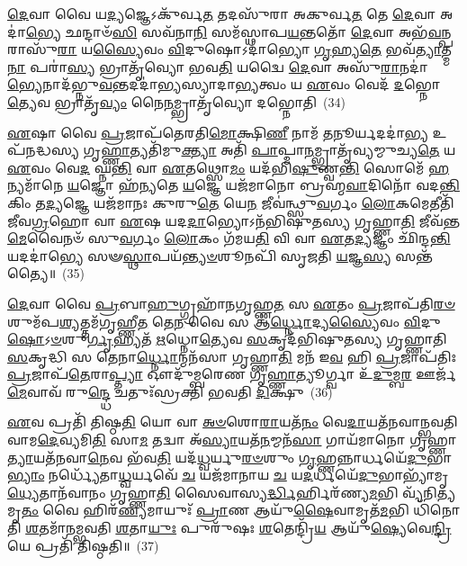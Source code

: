 {\anuvakamend[{\-\ul{𑌉}\-𑌕𑍍𑌥𑍍𑌯𑍇᳴ \ul{𑌦𑍇}\-𑌵𑌾 \ul{𑌅}\-𑌮𑍁𑌷𑍍𑌮𑌿᳴\-\ul{𑌲𑍍𑌲𑍋𑌁}\-𑌕 𑌏\-\ul{𑌕𑌾}\-𑌨𑍍𑌨𑌚᳴𑌤𑍍𑌵𑌾\-\ul{𑌰𑌿}\-\-\ul{𑍞}\-𑌶𑌚𑍍𑌚᳴}]}%

\-\ul{𑌦𑍇}\-𑌵𑌾 𑌵𑍈 𑌯\-\ul{𑌦𑍍𑌯}\-𑌜𑍍𑌞𑍇\-𑌽𑌕𑍁᳴𑌰𑍍𑌵\-\ul{𑌤} 𑌤𑌦𑌸𑍁᳴𑌰𑌾 𑌅𑌕𑍁𑌰𑍍𑌵\-\ul{𑌤} 𑌤𑍇 \ul{𑌦𑍇}\-𑌵𑌾 𑌅𑌦𑌾॑\-\ul{𑌭𑍍𑌯𑍇} 𑌛𑌨𑍍𑌦𑌾𑍞᳴\-\ul{𑌸𑌿} 𑌸𑌵᳴𑌨𑌾\-\ul{𑌨𑌿} 𑌸𑌮᳴𑌸𑍍𑌥𑌾𑌪\-\ul{𑌯}\-𑌨𑍍𑌤𑌤𑍋᳴ \ul{𑌦𑍇}\-𑌵𑌾 𑌅𑌭᳴\-\ul{𑌵}\-𑌨𑍍𑌪𑌰𑌾𑌸𑍁᳴\-\ul{𑌰𑌾} 𑌯\-\ul{𑌸𑍍𑌯𑍈}\-𑌵𑌂 \ul{𑌵𑌿}\-𑌦𑍁𑌷𑍋\-𑌽𑌦𑌾॑𑌭𑍍𑌯𑍋 \ul{𑌗𑍃}\-𑌹𑍍𑌯\-\ul{𑌤𑍇} 𑌭𑌵᳴\-\ul{𑌤𑍍𑌯𑌾}\-𑌤𑍍𑌮\-\ul{𑌨𑌾} 𑌪𑌰𑌾॑\-\ul{𑌸𑍍𑌯} 𑌭𑍍𑌰𑌾𑌤𑍃᳴𑌵𑍍𑌯𑍋 𑌭𑌵\-\ul{𑌤𑌿} 𑌯𑌦𑍍𑌵𑍈 \ul{𑌦𑍇}\-𑌵𑌾 𑌅𑌸𑍁᳴\-\ul{𑌰𑌾}\-𑌨𑌦𑌾॑\-\ul{𑌭𑍍𑌯𑍇}\-𑌨𑌾\-𑌦᳴𑌭𑍍𑌨𑍁\-\ul{𑌵}\-𑌨𑍍𑌤𑌦𑌦𑌾॑𑌭𑍍𑌯𑌸𑍍𑌯𑌾𑌦𑌾\-\ul{𑌭𑍍𑌯}\-𑌤𑍍𑌵𑌂 𑌯 \ul{𑌏}\-𑌵𑌂 𑌵𑍇𑌦᳴ \ul{𑌦}\-𑌭𑍍𑌨𑍋\-\ul{𑌤𑍍𑌯𑍇}\-𑌵 𑌭𑍍𑌰𑌾𑌤𑍃᳴\-\ul{𑌵𑍍𑌯𑌂} 𑌨𑍈\-\ul{𑌨}\-𑌮𑍍𑌭𑍍𑌰𑌾𑌤𑍃᳴𑌵𑍍𑌯𑍋 𑌦𑌭𑍍𑌨𑍋𑌤𑌿~(34)

\-\ul{𑌏}\-𑌷𑌾 𑌵𑍈 \ul{𑌪𑍍𑌰}\-𑌜𑌾𑌪᳴𑌤𑍇𑌰𑌤𑌿\-\ul{𑌮𑍋}\-𑌕𑍍𑌷𑌿\-\ul{𑌣𑍀} 𑌨𑌾𑌮᳴ \ul{𑌤}\-𑌨𑍂𑌰𑍍𑌯𑌦𑌦𑌾॑\-\ul{𑌭𑍍𑌯} 𑌉𑌪᳴𑌨𑌦𑍍𑌧𑌸𑍍𑌯 𑌗𑍃\-\ul{𑌹𑍍𑌣𑌾}\-𑌤𑍍𑌯𑌤𑌿᳴𑌮𑍁\-\ul{𑌕𑍍𑌤𑍍𑌯𑌾} 𑌅𑌤𑌿᳴ \ul{𑌪𑌾}\-𑌪𑍍𑌮𑌾\-\ul{𑌨}\-𑌮𑍍𑌭𑍍𑌰𑌾𑌤𑍃᳴𑌵𑍍𑌯𑌮𑍍𑌮𑍁𑌚𑍍𑌯\-\ul{𑌤𑍇} 𑌯 \ul{𑌏}\-𑌵𑌂 𑌵𑍇\-\ul{𑌦} 𑌘𑍍𑌨\-\ul{𑌨𑍍𑌤𑌿} 𑌵𑌾 \ul{𑌏}\-𑌤𑌥𑍍𑌸𑍋\-\ul{𑌮𑌂} 𑌯𑌦᳴𑌭𑌿\-\ul{𑌷𑍁}\-𑌣𑍍𑌵\-\ul{𑌨𑍍𑌤𑌿} 𑌸𑍋𑌮𑍇᳴ \ul{𑌹}\-𑌨𑍍𑌯𑌮𑌾᳴𑌨𑍇 \ul{𑌯}\-𑌜𑍍𑌞𑍋 𑌹᳴𑌨𑍍𑌯𑌤𑍇 \ul{𑌯}\-𑌜𑍍𑌞𑍇 𑌯𑌜᳴𑌮𑌾𑌨𑍋 𑌬𑍍𑌰𑌹𑍍𑌮\-\ul{𑌵𑌾}\-𑌦𑌿𑌨𑍋᳴ 𑌵𑌦\-\ul{𑌨𑍍𑌤𑌿} 𑌕𑌿𑌂 𑌤\-\ul{𑌦𑍍𑌯}\-𑌜𑍍𑌞𑍇 𑌯𑌜᳴𑌮𑌾𑌨𑌃 𑌕𑍁𑌰𑍁\-\ul{𑌤𑍇} 𑌯𑍇\-\ul{𑌨} 𑌜𑍀𑌵॑𑌨𑍍𑌥𑍍𑌸𑍁\-\ul{𑌵}\-𑌰𑍍𑌗𑌂 \ul{𑌲𑍋}\-𑌕𑌮𑍇𑌤𑍀𑌤𑌿᳴ 𑌜𑍀𑌵\-\ul{𑌗𑍍𑌰}\-𑌹𑍋 𑌵𑌾 \ul{𑌏}\-𑌷 𑌯𑌦\-\ul{𑌦𑌾}\-𑌭𑍍𑌯𑍋\-𑌽𑌨᳴𑌭𑌿𑌷𑍁𑌤𑌸𑍍𑌯 𑌗𑍃𑌹𑍍𑌣𑌾\-\ul{𑌤𑌿} 𑌜𑍀𑌵᳴𑌨𑍍𑌤\-\ul{𑌮𑍇}\-𑌵𑍈𑌨𑍞᳴ 𑌸𑍁\-\ul{𑌵}\-𑌰𑍍𑌗𑌂 \ul{𑌲𑍋}\-𑌕𑌂 𑌗᳴𑌮𑌯\-\ul{𑌤𑌿} 𑌵𑌿 𑌵𑌾 \ul{𑌏}\-𑌤\-\ul{𑌦𑍍𑌯}\-𑌜𑍍𑌞𑌂 𑌛𑌿᳴𑌨𑍍𑌦\-\ul{𑌨𑍍𑌤𑌿} 𑌯𑌦𑌦𑌾॑𑌭𑍍𑌯𑍇 𑌸𑍟\-\ul{𑌸𑍍𑌥𑌾}\-𑌪𑌯᳴\-\ul{𑌨𑍍𑌤𑍍𑌯}\-\-\ul{𑍞}\-𑌶𑍂𑌨𑌪𑌿᳴ 𑌸𑍃𑌜𑌤𑌿 \ul{𑌯}\-𑌜𑍍𑌞\-\ul{𑌸𑍍𑌯} 𑌸𑌨𑍍𑌤᳴𑌤𑍍𑌯𑍈॥~(35)

{\anuvakamend[{\-\ul{𑌦}\-\-\ul{𑌭𑍍𑌨𑍋}\-𑌤𑍍𑌯𑌨᳴𑌭𑌿𑌷𑍁𑌤𑌸𑍍𑌯 𑌗𑍃\-\ul{𑌹𑍍𑌣𑌾}\-𑌤𑍍𑌯𑍇\-\ul{𑌕𑌾}\-𑌨𑍍𑌨𑌵𑌿𑍞᳴\-\ul{𑌶}\-𑌤𑌿𑌶𑍍𑌚᳴}]}%

\-\ul{𑌦𑍇}\-𑌵𑌾 𑌵𑍈 \ul{𑌪𑍍𑌰}\-𑌬𑌾\-\ul{𑌹𑍁}\-𑌗𑍍𑌗𑍍𑌰𑌹𑌾᳴𑌨𑌗𑍃𑌹𑍍𑌣\-\ul{𑌤} 𑌸 \ul{𑌏}\-𑌤𑌂 \ul{𑌪𑍍𑌰}\-𑌜𑌾𑌪᳴𑌤𑌿\-\ul{𑌰}\-\-\ul{𑍞}\-𑌶𑍁𑌮᳴𑌪\-\ul{𑌶𑍍𑌯}\-𑌤𑍍𑌤𑌮᳴𑌗𑍃𑌹𑍍𑌣𑍀\-\ul{𑌤} 𑌤𑍇\-\ul{𑌨} 𑌵𑍈 𑌸 𑌆॑\-\ul{𑌰𑍍𑌧𑍍𑌨𑍋}\-𑌦𑍍𑌯\-\ul{𑌸𑍍𑌯𑍈}\-𑌵𑌂 \ul{𑌵𑌿}\-𑌦𑍁\-\ul{𑌷𑍋}\-\-𑌽\-\ul{𑍞}\-𑌶𑍁\-\ul{𑌰𑍍𑌗𑍃}\-𑌹𑍍𑌯𑌤᳴ \ul{𑌋}\-𑌧𑍍𑌨𑍋\-\ul{𑌤𑍍𑌯𑍇}\-𑌵 \ul{𑌸}\-𑌕𑍃𑌦᳴𑌭𑌿𑌷𑍁𑌤𑌸𑍍𑌯 𑌗𑍃𑌹𑍍𑌣𑌾𑌤𑌿 \ul{𑌸}\-𑌕𑍃𑌦𑍍𑌧𑌿 𑌸 𑌤𑍇𑌨𑌾\-\ul{𑌰𑍍𑌧𑍍𑌨𑍋}\-𑌨𑍍𑌮𑌨᳴𑌸𑌾 𑌗𑍃𑌹𑍍𑌣𑌾\-\ul{𑌤𑌿} 𑌮𑌨᳴ 𑌇\-\ul{𑌵} 𑌹𑌿 \ul{𑌪𑍍𑌰}\-𑌜𑌾𑌪᳴𑌤𑌿𑌃 \ul{𑌪𑍍𑌰}\-𑌜𑌾𑌪᳴\-\ul{𑌤𑍇}\-𑌰𑌾\-\ul{𑌪𑍍𑌤𑍍𑌯𑌾} 𑌔𑌦𑍁᳴𑌮𑍍𑌬𑌰𑍇𑌣 𑌗𑍃\-\ul{𑌹𑍍𑌣𑌾}\-𑌤𑍍𑌯𑍂𑌰𑍍𑌗𑍍𑌵𑌾 𑌉᳴\-\ul{𑌦𑍁}\-𑌮𑍍𑌬\-\ul{𑌰} 𑌊𑌰𑍍𑌜᳴\-\ul{𑌮𑍇}\-𑌵𑌾𑌵᳴ 𑌰𑍁\-\ul{𑌨𑍍𑌦𑍍𑌧𑍇} 𑌚𑌤𑍁𑌃᳴𑌸𑍍𑌰𑌕𑍍𑌤𑌿 𑌭𑌵𑌤𑌿 \ul{𑌦𑌿}\-𑌕𑍍𑌷𑍁~(36)

\-\ul{𑌏}\-𑌵 𑌪𑍍𑌰𑌤𑌿᳴ 𑌤𑌿𑌷𑍍𑌠\-\ul{𑌤𑌿} 𑌯𑍋 𑌵𑌾 \ul{𑌅}\-\-\ul{𑍞}\-𑌶𑍋\-\ul{𑌰𑌾}\-𑌯𑌤᳴\-\ul{𑌨𑌂} 𑌵𑍇\-\ul{𑌦𑌾}\-𑌯𑌤᳴𑌨𑌵𑌾𑌨𑍍𑌭𑌵𑌤𑌿 𑌵𑌾𑌮\-\ul{𑌦𑍇}\-𑌵𑍍𑌯𑌮𑌿\-\ul{𑌤𑌿} 𑌸𑌾\-\ul{𑌮} 𑌤𑌦𑍍𑌵𑌾 𑌅᳴\-\ul{𑌸𑍍𑌯𑌾}\-𑌯𑌤᳴\-\ul{𑌨}\-𑌮𑍍𑌮𑌨᳴\-\ul{𑌸𑌾} 𑌗𑌾𑌯᳴𑌮𑌾𑌨𑍋 𑌗𑍃𑌹𑍍𑌣𑌾\-\ul{𑌤𑍍𑌯𑌾}\-𑌯𑌤᳴𑌨𑌵𑌾\-\ul{𑌨𑍇}\-𑌵 𑌭᳴𑌵\-\ul{𑌤𑌿} 𑌯𑌦᳴\-\ul{𑌧𑍍𑌵}\-𑌰𑍍𑌯𑍁\-\ul{𑌰}\-\-\ul{𑍞}\-𑌶𑍁𑌂 \ul{𑌗𑍃}\-𑌹𑍍𑌣𑌨𑍍𑌨𑌾𑌰𑍍𑌧𑌯𑍇᳴\-\ul{𑌦𑍁}\-𑌭𑌾\-\ul{𑌭𑍍𑌯𑌾𑌂} 𑌨𑌰𑍍𑌧𑍍𑌯𑍇᳴𑌤𑌾\-\ul{𑌧𑍍𑌵}\-𑌰𑍍𑌯𑌵𑍇᳴ \ul{𑌚} 𑌯𑌜᳴𑌮𑌾𑌨𑌾𑌯 \ul{𑌚} 𑌯\-\ul{𑌦}\-𑌰𑍍𑌧𑌯𑍇᳴\-\ul{𑌦𑍁}\-𑌭𑌾𑌭𑍍𑌯𑌾᳴𑌮𑍃\-\ul{𑌧𑍍𑌯𑍇}\-𑌤𑌾𑌨᳴𑌵𑌾𑌨𑌂 𑌗𑍃𑌹𑍍𑌣𑌾\-\ul{𑌤𑌿} 𑌸𑍈𑌵𑌾𑌸𑍍𑌯\-\ul{𑌰𑍍𑌦𑍍𑌧𑌿}\-𑌰𑍍\mbox{}𑌹𑌿𑌰᳴𑌣𑍍𑌯\-\ul{𑌮}\-𑌭𑌿 𑌵𑍍𑌯᳴𑌨𑌿\-\ul{𑌤𑍍𑌯}\-𑌮𑍃\-\ul{𑌤𑌂} 𑌵𑍈 𑌹𑌿𑌰᳴\-\ul{𑌣𑍍𑌯}\-𑌮𑌾𑌯𑍁𑌃᳴ \ul{𑌪𑍍𑌰𑌾}\-𑌣 𑌆𑌯𑍁᳴\-\ul{𑌷𑍈}\-𑌵𑌾𑌮𑍃𑌤᳴\-\ul{𑌮}\-𑌭𑌿 𑌧𑌿᳴𑌨𑍋𑌤𑌿 \ul{𑌶}\-𑌤𑌮𑌾᳴𑌨𑌮𑍍𑌭𑌵𑌤𑌿 \ul{𑌶}\-𑌤𑌾\-\ul{𑌯𑍁𑌃} 𑌪𑍁𑌰𑍁᳴𑌷𑌃 \ul{𑌶}\-𑌤𑍇𑌨𑍍𑌦𑍍𑌰𑌿᳴\-\ul{𑌯} 𑌆𑌯𑍁᳴\-\ul{𑌷𑍍𑌯𑍇}\-𑌵𑍇\-\ul{𑌨𑍍𑌦𑍍𑌰𑌿}\-𑌯𑍇 𑌪𑍍𑌰𑌤𑌿᳴ 𑌤𑌿𑌷𑍍𑌠𑌤𑌿॥~(37)

